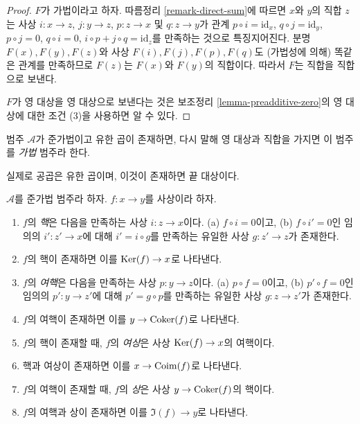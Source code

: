 \begin{proof}
$F$가 가법이라고 하자. 따름정리 \ref{remark-direct-sum}에 따르면
$x$와 $y$의 직합 $z$는 사상
$i : x \to z$, $j : y \to z$, $p : z \to x$ 및
$q : z \to y$가 관계 $p \circ i = \text{id}_x$,
$q \circ j = \text{id}_y$, $p \circ j = 0$, $q \circ i = 0$,
$i \circ p + j \circ q = \text{id}_z$를 만족하는 것으로 특징지어진다.
분명 $F(x), F(y), F(z)$와 사상 $F(i), F(j), F(p), F(q)$도 (가법성에 의해)
똑같은 관계를 만족하므로 $F(z)$는 $F(x)$와 $F(y)$의 직합이다.
따라서 $F$는 직합을 직합으로 보낸다.

\medskip\noindent
$F$가 영 대상을 영 대상으로 보낸다는 것은 보조정리
\ref{lemma-preadditive-zero}의 영 대상에 대한 조건 (3)을 사용하면 알 수 있다.
\end{proof}

\begin{definition}
\label{definition-additive-category}
범주 $\mathcal{A}$가 준가법이고 유한 곱이 존재하면, 다시 말해 영 대상과
직합을 가지면 이 범주를 {\it 가법} 범주라 한다.
\end{definition}

\noindent
실제로 공곱은 유한 곱이며, 이것이 존재하면 끝 대상이다.

\begin{definition}
\label{definition-kernel}
$\mathcal{A}$를 준가법 범주라 하자. $f : x \to y$를 사상이라 하자.
\begin{enumerate}
\item $f$의 {\it 핵}은 다음을 만족하는 사상
$i : z \to x$이다. (a) $f \circ i = 0$이고, (b)
$f \circ i' = 0$인 임의의 $i' : z' \to x$에 대해
$i' = i \circ g$를 만족하는 유일한 사상 $g : z' \to z$가 존재한다.
\item $f$의 핵이 존재하면 이를 $\mathop{\mathrm{Ker}}(f) \to x$로 나타낸다.
\item $f$의 {\it 여핵}은 다음을 만족하는 사상
$p : y \to z$이다. (a) $p \circ f = 0$이고, (b)
$p' \circ f = 0$인 임의의 $p' : y \to z'$에 대해
$p' = g \circ p$를 만족하는 유일한 사상 $g : z \to z'$가 존재한다.
\item $f$의 여핵이 존재하면 이를 $y \to \mathop{\mathrm{Coker}}(f)$로 나타낸다.
\item $f$의 핵이 존재할 때, $f$의 {\it 여상}은 사상
$\mathop{\mathrm{Ker}}(f) \to x$의 여핵이다.
\item 핵과 여상이 존재하면 이를 $x \to \mathop{\mathrm{Coim}}(f)$로 나타낸다.
\item $f$의 여핵이 존재할 때, $f$의 {\it 상}은 사상
$y \to \mathop{\mathrm{Coker}}(f)$의 핵이다.
\item $f$의 여핵과 상이 존재하면 이를 $\Im(f) \to y$로 나타낸다.
\end{enumerate}
\end{definition}

